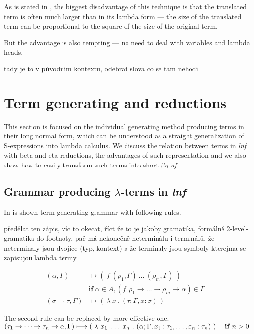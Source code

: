 \documentclass{sig-alternate}
\newcommand{\lterms}{$\lambda$-terms\xspace}
\newcommand{\benf}{$\beta\eta$-\textit{nf}\xspace}
\newcommand{\lnf}{\textit{lnf}\xspace}
\newcommand{\ar}{\rightarrow\xspace}
\newcommand{\gar}{\longmapsto}
\newcommand{\red}[1]{{\color{red} #1}}
\begin{document}
As is stated in \cite{jones87},
the biggest disadvantage of this technique is that the translated
term is often much larger than in its lambda form --- the size of
the translated term can be proportional to the
square of the size of the original term. 

But the advantage is also tempting --- no need to deal with variables
and lambda heads.

\red{tady je to v původnim kontextu, odebrat slova co se tam nehodí}

\section{Term generating and reductions}

This section is focused on the individual generating method producing
terms in their long normal form, which can be understood as a straight 
generalization of S-expressions into lambda calculus. 
We discuss the relation between terms in \lnf with beta and eta reductions,
the advantages of such representation and we also show how to easily 
transform such terms into short \benf.
   
\subsection{Grammar producing \lterms in \lnf}

In \cite{barendregt10} is shown term generating grammar with 
following rules.

\red{předělat ten zápis, víc to okecat, říct že to je jakoby gramatika, 
formálně 2-level-gramatika do footnoty, pač má nekonečně neterminálu  
i terminálů. že neterminaly jsou dvojice (typ, kontext) a že terminaly jsou
symboly kterejma se zapisujou lambda termy}

\begin{align*}
( \alpha , \Gamma )  
&\gar
(~f~( \rho_1 , \Gamma )~\dots~( \rho_m , \Gamma )~)
\\& \textbf{if } \alpha \in A,
(f : \rho_1 \ar \dots \ar \rho_m \ar \alpha) \in \Gamma
\\ 
( \sigma \rightarrow \tau , \Gamma )  
&\gar
(~\lambda~x~.~( \tau ; \Gamma,x:\sigma )~)
&   
\end{align*}

The second rule can be replaced by more effective one.
$ 
( \tau_1 \ar \dots \ar \tau_n \ar \alpha , \Gamma )  
\gar \\
(~\lambda~x_1~\dots~x_n~.~
( \alpha ; \Gamma , x_1:\tau_1 , \dots , x_n:\tau_n  )~)
~~~~ \textbf{if } n > 0
$ 
\end{document}
